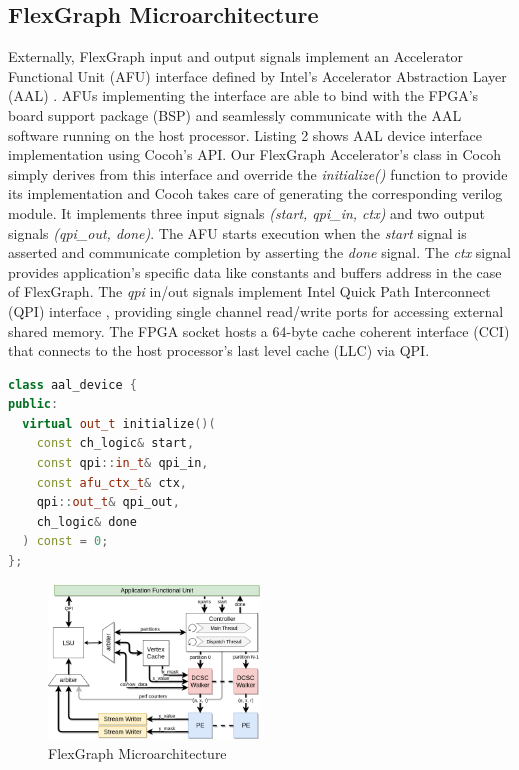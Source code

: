 \subsection{FlexGraph Microarchitecture}

Externally, FlexGraph input and output signals implement an Accelerator Functional Unit (AFU) interface defined by Intel's Accelerator Abstraction Layer (AAL) \cite{Intel-FPGA}. AFUs implementing the interface are able to bind with the FPGA's board support package (BSP) and seamlessly communicate with the AAL software running on the host processor. Listing 2 shows AAL device interface implementation using Cocoh's API. Our FlexGraph Accelerator's class in Cocoh simply derives from this interface and override the \textit{initialize()} function to provide its implementation and Cocoh takes care of generating the corresponding verilog module. It implements three input signals \textit{(start, qpi\_in, ctx)} and two output signals \textit{(qpi\_out, done)}. The AFU starts execution when the \textit{start} signal is asserted and communicate completion by asserting the \textit{done} signal. The \textit{ctx} signal provides application's specific data like constants and buffers address in the case of FlexGraph. The \textit{qpi} in/out signals implement Intel Quick Path Interconnect (QPI) interface \cite{QPI}, providing single channel read/write ports for accessing external shared memory. The FPGA socket hosts a 64-byte cache coherent interface (CCI) \cite{CCI} that connects to the host processor's last level cache (LLC) via QPI.     

\begin{lstlisting}[language=C++, caption=AAL Device Interface in Cocoh C++]
class aal_device {
public: 
  virtual out_t initialize()(
    const ch_logic& start, 
    const qpi::in_t& qpi_in, 
    const afu_ctx_t& ctx, 
    qpi::out_t& qpi_out, 
    ch_logic& done
  ) const = 0;  
};
\end{lstlisting}

\begin{figure}[htbp]
\centering
\includegraphics[width=0.5\textwidth]{figures/microarchitecture}
\caption{FlexGraph Microarchitecture}
\label{fig:microarchitecture}
\end{figure}

